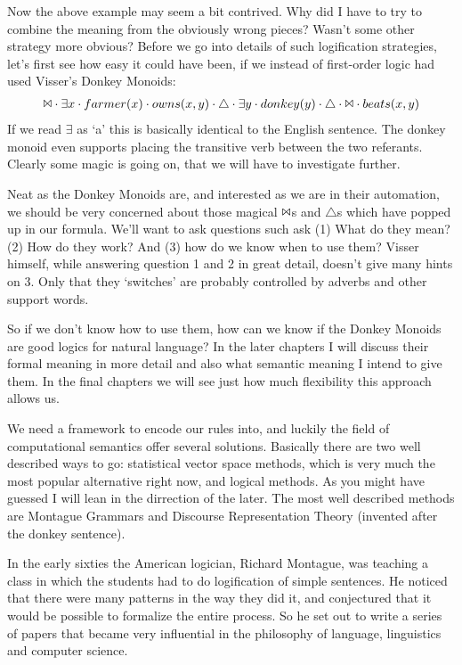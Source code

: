 \documentclass[12pt]{article}
\begin{document}
Now the above example may seem a bit contrived. Why did I have to try to combine the meaning from the obviously wrong pieces? Wasn't some other strategy more obvious? Before we go into details of such logification strategies, let's first see how easy it could have been, if we instead of first-order logic had used Visser's Donkey Monoids:
%
\begin{align}
\Bowtie \cdot \exists x \cdot farmer(x) \cdot owns(x,y) \cdot\triangle\cdot\exists y \cdot donkey(y) \cdot\triangle\cdot\Bowtie\cdot beats(x,y)
\end{align}
%
If we read $\exists$ as `a' this is basically identical to the English sentence. The donkey monoid even supports placing the transitive verb between the two referants. Clearly some magic is going on, that we will have to investigate further.

Neat as the Donkey Monoids are, and interested as we are in their automation, we should be very concerned about those magical $\Bowtie$s and $\triangle$s which have popped up in our formula. We'll want to ask questions such ask (1) What do they mean? (2) How do they work? And (3) how do we know when to use them? Visser himself, while answering question 1 and 2 in great detail, doesn't give many hints on 3. Only that they `switches' are probably controlled by adverbs and other support words.

So if we don't know how to use them, how can we know if the Donkey Monoids are good logics for natural language? In the later chapters I will discuss their formal meaning in more detail and also what semantic meaning I intend to give them. In the final chapters we will see just how much flexibility this approach allows us.

We need a framework to encode our rules into, and luckily the field of computational semantics offer several solutions. Basically there are two well described ways to go: statistical vector space methods, which is very much the most popular alternative right now, and logical methods. As you might have guessed I will lean in the dirrection of the later. The most well described methods are Montague Grammars and Discourse Representation Theory (invented after the donkey sentence).

In the early sixties the American logician, Richard Montague, was teaching a class in which the students had to do logification of simple sentences. He noticed that there were many patterns in the way they did it, and conjectured that it would be possible to formalize the entire process. So he set out to write a series of papers that became very influential in the philosophy of language, linguistics and computer science.
\end{document}
